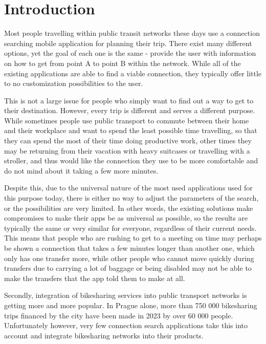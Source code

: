 \chapter*{Introduction}

Most people travelling within public transit networks these days use a connection searching mobile application for planning their trip. There exist many different options, yet the goal of each one is the same - provide the user with information on how to get from point A to point B within the network. While all of the existing applications are able to find a viable connection, they typically offer little to no customization possibilities to the user. 

This is not a large issue for people who simply want to find out a way to get to their destination. However, every trip is different and serves a different purpose. While sometimes people use public transport to commute between their home and their workplace and want to spend the least possible time travelling, so that they can spend the most of their time doing productive work, other times they may be returning from their vacation with heavy suitcases or travelling with a stroller, and thus would like the connection they use to be more comfortable and do not mind about it taking a few more minutes.

Despite this, due to the universal nature of the most used applications used for this purpose today, there is either no way to adjust the parameters of the search, or the possibilities are very limited. In other words, the existing solutions make compromises to make their apps be as universal as possible, so the results are typically the same or very similar for everyone, regardless of their current needs. This means that people who are rushing to get to a meeting on time may perhaps be shown a connection that takes a few minutes longer than another one, which only has one transfer more, while other people who cannot move quickly during transfers due to carrying a lot of baggage or being disabled may not be able to make the transfers that the app told them to make at all.

Secondly, integration of bikesharing services into public transport networks is getting more and more popular. In Prague alone, more than 750 000 bikesharing trips financed by the city have been made in 2023 by over 60 000 people\cite{ZpravodajPID2024}. Unfortunately however, very few connection search applications take this into account and integrate bikesharing networks into their products.


